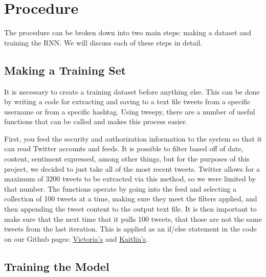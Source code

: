 \documentclass[%
 reprint,
 amsmath,amssymb,
 aps,
]{revtex4-2}
\begin{document}
\section{Procedure}

The procedure can be broken down into two main steps: making a dataset and training the RNN. We will discuss each of these steps in detail.

\subsection{Making a Training Set}
It is necessary to create a training dataset before anything else. This can be done by writing a code for extracting and saving to a text file tweets from a specific username or from a specific hashtag. Using tweepy, there are a number of useful functions that can be called and makes this process easier. 

First, you feed the security and authorization information to the system so that it can read Twitter accounts and feeds. It is possible to filter based off of date, content, sentiment expressed, among other things, but for the purposes of this project, we decided to just take all of the most recent tweets. Twitter allows for a maximum of 3200 tweets to be extracted via this method, so we were limited by that number. The functions operate by going into the feed and selecting a collection of 100 tweets at a time, making sure they meet the filters applied, and then appending the tweet content to the output text file. It is then important to make sure that the next time that it pulls 100 tweets, that those are not the same tweets from the last iteration. This is applied as an if/else statement in the code on our Github pages: \href{https://github.com/vvk3da/PY895ML/tree/master/FinalProject}{Victoria's} and \href{https://github.com/ksalyer/py895/tree/master/FinalProject}{Kaitlin's}.

\subsection{Training the Model}
\end{document}
